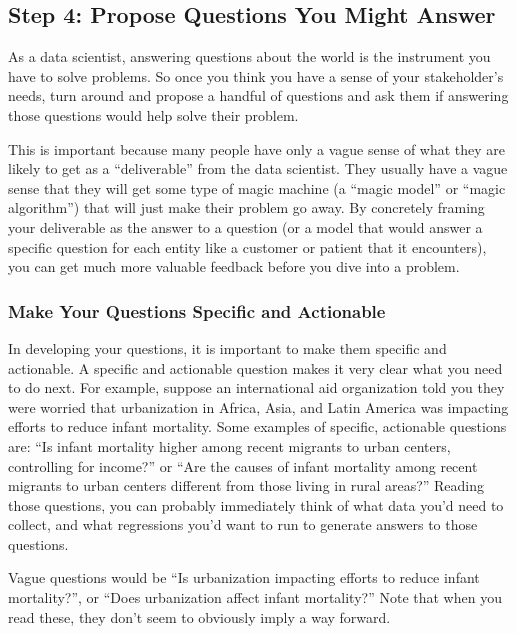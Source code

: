 \documentclass[letterpaper,10pt,english]{jupyterBook}
\begin{document}
\subsection{Step 4: Propose Questions You Might Answer}
\label{\detokenize{10_introduction/30_solving_the_right_problem:step-4-propose-questions-you-might-answer}}
\sphinxAtStartPar
As a data scientist, answering questions about the world is the instrument you have to solve problems. So once you think you have a sense of your stakeholder’s needs, turn around and propose a handful of questions and ask them if answering those questions would help solve their problem.

\sphinxAtStartPar
This is important because many people have only a vague sense of what they are likely to get as a “deliverable” from the data scientist. They usually have a vague sense that they will get some type of magic machine (a “magic model” or “magic algorithm”) that will just make their problem go away. By concretely framing your deliverable as the answer to a question (or a model that would answer a specific question for each entity like a customer or patient that it encounters), you can get much more valuable feedback before you dive into a problem.


\subsubsection{Make Your Questions Specific and Actionable}
\label{\detokenize{10_introduction/30_solving_the_right_problem:make-your-questions-specific-and-actionable}}
\sphinxAtStartPar
In developing your questions, it is important to make them specific and actionable. A specific and actionable question makes it very clear what you need to do next. For example, suppose an international aid organization told you they were worried that urbanization in Africa, Asia, and Latin America was impacting efforts to reduce infant mortality. Some examples of specific, actionable questions are: “Is infant mortality higher among recent migrants to urban centers, controlling for income?” or “Are the causes of infant mortality among recent migrants to urban centers different from those living in rural areas?” Reading those questions, you can probably immediately think of what data you’d need to collect, and what regressions you’d want to run to generate answers to those questions.

\sphinxAtStartPar
Vague questions would be “Is urbanization impacting efforts to reduce infant mortality?”, or “Does urbanization affect infant mortality?” Note that when you read these, they don’t seem to obviously imply a way forward.
\end{document}
